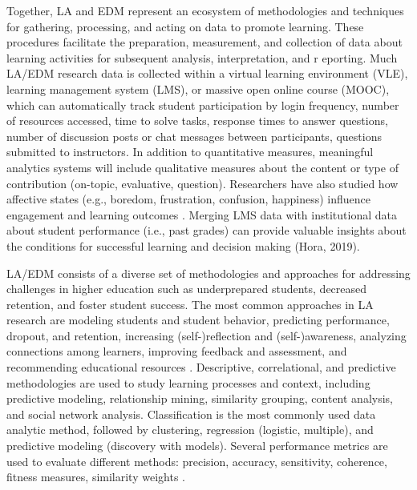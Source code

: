 \documentclass[sigconf]{acmart}
\begin{document}

Together, LA and EDM represent an ecosystem of methodologies and techniques 
for gathering, processing, and acting on data to promote learning. These 
procedures facilitate the preparation, measurement, and collection of data 
about learning activities for subsequent analysis, interpretation, and r
eporting. Much LA/EDM research data is collected within a virtual learning 
environment (VLE), learning management system (LMS), or massive open online 
course (MOOC), which can automatically track student participation by login 
frequency, number of resources accessed, time to solve tasks, response times 
to answer questions, number of discussion posts or chat messages between 
participants, questions submitted to instructors. In addition to quantitative 
measures, meaningful analytics systems will include qualitative measures about 
the content or type of contribution (on-topic, evaluative, question). 
Researchers have also studied how affective states (e.g., boredom, 
frustration, confusion, happiness) influence engagement and learning outcomes 
\cite{pardos14}. Merging LMS data with institutional data about student 
performance (i.e., past grades) can provide valuable insights about the 
conditions for successful learning and decision making (Hora, 2019). 


LA/EDM consists of a diverse set of methodologies and approaches for 
addressing challenges in higher education such as underprepared students, 
decreased retention, and foster student success. The most common approaches in 
LA research are modeling students and student behavior, predicting performance, 
dropout, and retention, increasing (self-)reflection and (self-)awareness, 
analyzing connections among learners, improving feedback and assessment, and 
recommending educational resources \cite{lang17, lester19, papamitsiou14}. 
Descriptive, correlational, and predictive methodologies are used to study 
learning processes and context, including predictive modeling, relationship 
mining, similarity grouping, content analysis, and social network analysis. 
Classification is the most commonly used data analytic method, followed by 
clustering, regression (logistic, multiple), and predictive modeling (discovery
with models). Several performance metrics are used to evaluate different 
methods: precision, accuracy, sensitivity, coherence, fitness measures, 
similarity weights \cite{bakerYucef09}. 
\end{document}
